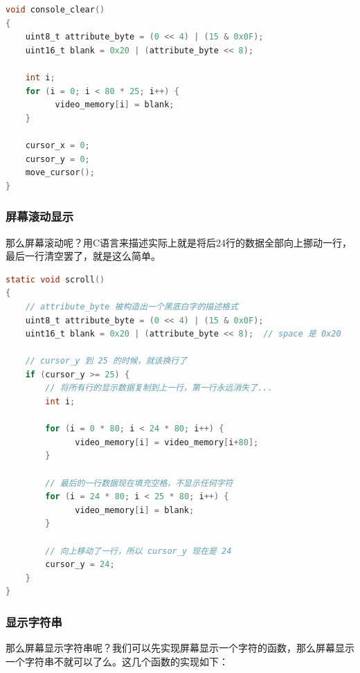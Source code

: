 \begin{lstlisting}[language = C, caption = drivers/console.c]
void console_clear()
{
	uint8_t attribute_byte = (0 << 4) | (15 & 0x0F);
	uint16_t blank = 0x20 | (attribute_byte << 8);

	int i;
	for (i = 0; i < 80 * 25; i++) {
	      video_memory[i] = blank;
	}

	cursor_x = 0;
	cursor_y = 0;
	move_cursor();
}
\end{lstlisting}

\subsubsection{屏幕滚动显示}

\par 那么屏幕滚动呢？用C语言来描述实际上就是将后24行的数据全部向上挪动一行，最后一行清空罢了，就是这么简单。

\begin{lstlisting}[language = C, caption = drivers/console.c]
static void scroll()
{
	// attribute_byte 被构造出一个黑底白字的描述格式
	uint8_t attribute_byte = (0 << 4) | (15 & 0x0F);
	uint16_t blank = 0x20 | (attribute_byte << 8);  // space 是 0x20

	// cursor_y 到 25 的时候，就该换行了
	if (cursor_y >= 25) {
		// 将所有行的显示数据复制到上一行，第一行永远消失了...
		int i;
		
		for (i = 0 * 80; i < 24 * 80; i++) {
		      video_memory[i] = video_memory[i+80];
		}

		// 最后的一行数据现在填充空格，不显示任何字符
		for (i = 24 * 80; i < 25 * 80; i++) {
		      video_memory[i] = blank;
		}
		
		// 向上移动了一行，所以 cursor_y 现在是 24
		cursor_y = 24;
	}
}
\end{lstlisting}

\subsubsection{显示字符串}

\par 那么屏幕显示字符串呢？我们可以先实现屏幕显示一个字符的函数，那么屏幕显示一个字符串不就可以了么。这几个函数的实现如下：

